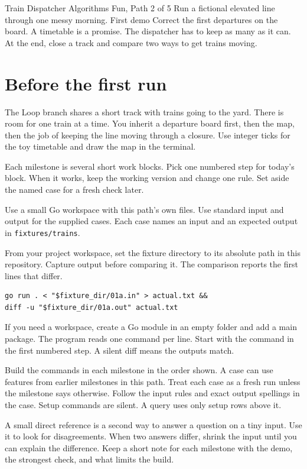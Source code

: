 \documentclass[11pt,letterpaper]{article}
\begin{document}
\coursecover
  {Train Dispatcher}
  {Algorithms Fun, Path 2 of 5}
  {Run a fictional elevated line through one messy morning.}
  {First demo}
  {Correct the first departures on the board.}
  {A timetable is a promise. The dispatcher has to keep as many as it can.}
  {At the end, close a track and compare two ways to get trains moving.}
\tableofcontents
\clearpage
\section{Before the first run}
The Loop branch shares a short track with trains going to the yard. There is room for one train at a time. You inherit a departure board first, then the map, then the job of keeping the line moving through a closure. Use integer ticks for the toy timetable and draw the map in the terminal.

Each milestone is several short work blocks. Pick one numbered step for today's block. When it works, keep the working version and change one rule. Set aside the named case for a fresh check later.

Use a small Go workspace with this path's own files. Use standard input and output for the supplied cases. Each case names an input and an expected output in \texttt{fixtures/trains}.

From your project workspace, set the fixture directory to its absolute path in this repository. Capture output before comparing it. The comparison reports the first lines that differ.
\begin{samepage}
\small
\begin{verbatim}
go run . < "$fixture_dir/01a.in" > actual.txt &&
diff -u "$fixture_dir/01a.out" actual.txt
\end{verbatim}
\end{samepage}

If you need a workspace, create a Go module in an empty folder and add a main package. The program reads one command per line. Start with the command in the first numbered step. A silent diff means the outputs match.

Build the commands in each milestone in the order shown. A case can use features from earlier milestones in this path. Treat each case as a fresh run unless the milestone says otherwise. Follow the input rules and exact output spellings in the case. Setup commands are silent. A query uses only setup rows above it.

A small direct reference is a second way to answer a question on a tiny input. Use it to look for disagreements. When two answers differ, shrink the input until you can explain the difference. Keep a short note for each milestone with the demo, the strongest check, and what limits the build.
\end{document}
